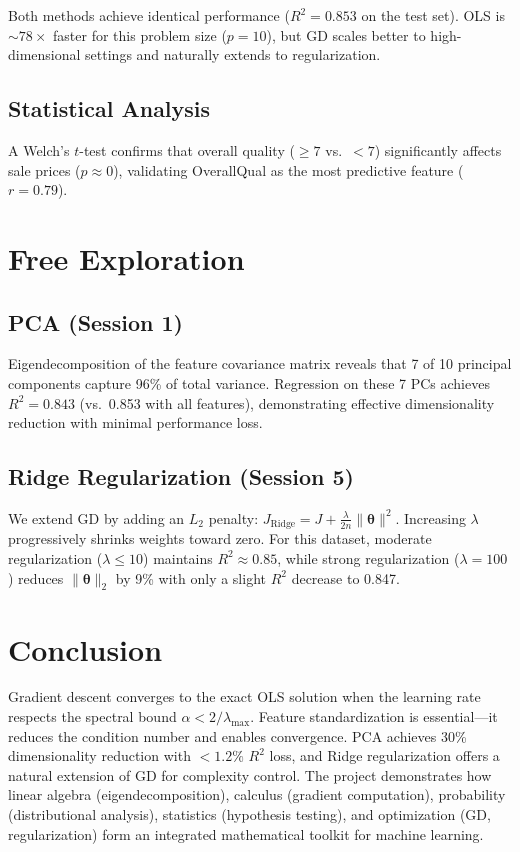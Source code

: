 \documentclass[11pt, twocolumn]{article}
\begin{document}
Both methods achieve identical performance ($R^2 = 0.853$ on the test set). OLS is ${\sim}78\times$ faster for this problem size ($p = 10$), but GD scales better to high-dimensional settings and naturally extends to regularization.

\subsection{Statistical Analysis}

A Welch's $t$-test confirms that overall quality ($\geq 7$ vs.\ $< 7$) significantly affects sale prices ($p \approx 0$), validating OverallQual as the most predictive feature ($r = 0.79$).

\section{Free Exploration}

\subsection{PCA (Session 1)}

Eigendecomposition of the feature covariance matrix reveals that 7 of 10 principal components capture 96\% of total variance. Regression on these 7 PCs achieves $R^2 = 0.843$ (vs.\ 0.853 with all features), demonstrating effective dimensionality reduction with minimal performance loss.

\subsection{Ridge Regularization (Session 5)}

We extend GD by adding an $L_2$ penalty: $J_{\text{Ridge}} = J + \frac{\lambda}{2n}\|\boldsymbol{\theta}\|^2$. Increasing $\lambda$ progressively shrinks weights toward zero. For this dataset, moderate regularization ($\lambda \leq 10$) maintains $R^2 \approx 0.85$, while strong regularization ($\lambda = 100$) reduces $\|\boldsymbol{\theta}\|_2$ by 9\% with only a slight $R^2$ decrease to 0.847.

\section{Conclusion}

Gradient descent converges to the exact OLS solution when the learning rate respects the spectral bound $\alpha < 2/\lambda_{\max}$. Feature standardization is essential---it reduces the condition number and enables convergence. PCA achieves 30\% dimensionality reduction with $<1.2\%$ $R^2$ loss, and Ridge regularization offers a natural extension of GD for complexity control. The project demonstrates how linear algebra (eigendecomposition), calculus (gradient computation), probability (distributional analysis), statistics (hypothesis testing), and optimization (GD, regularization) form an integrated mathematical toolkit for machine learning.
\end{document}
